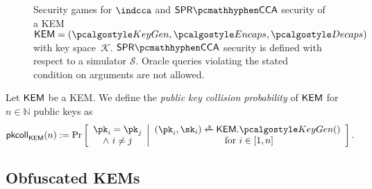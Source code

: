 \begin{figure}
    
    \caption[
        Security games for $\indcca$ and $\sprcca$ security of a KEM or obfuscated KEM.
    ]{
        Security games for $\indcca$ and $\sprcca$ security of a KEM~$\KEM = (\kgen, \encaps, \decaps)$ with key space~$\mathcal K$. $\sprcca$ security is defined with respect to a simulator $\mathcal S$. Oracle queries violating the stated condition on arguments are not allowed.
    }
    \label{fig:kem-security}
\end{figure}

\begin{definition}
    \label{def:pk-collisions}
    Let $\mathsf{KEM}$ be a KEM.
    We define the \emph{public key collision probability} of $\mathsf{KEM}$ for $n \in \mathbb{N}$ public keys as
    \[
        \pkcoll{\KEM}(n) := \Pr\left[
            \begin{array}{c}
                \pk_i = \pk_j \\
                \land~ i \neq j
            \end{array}
            \middle|
            \begin{array}{c}
                (\pk_i,\sk_i) \getsr \KEM.\kgen() \\
                \text{ for } i \in [1,n]
            \end{array}
            \right].
    \]
\end{definition}

\subsection{Obfuscated KEMs}

